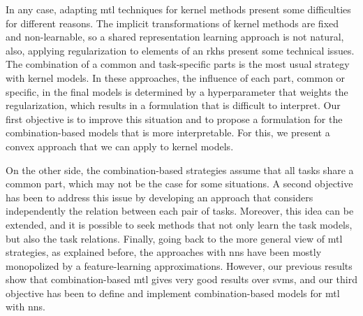 In any case, adapting \acrshort*{mtl} techniques for kernel methods present some difficulties for different reasons. The implicit transformations of kernel methods are fixed and non-learnable, so a shared representation learning approach is not natural, also, applying regularization to elements of an \acrshort{rkhs} present some technical issues. The combination of a common and task-specific parts is the most usual strategy with kernel models. 
In these approaches, the influence of each part, common or specific, in the final models is determined by a hyperparameter that weights the regularization, which results in a formulation that is difficult to interpret. Our first objective is to improve this situation and to propose a formulation for the combination-based models that is more interpretable. For this, we present a convex approach that we can apply to kernel models.

On the other side, the combination-based strategies assume that all tasks share a common part, which may not be the case for some situations. A second objective has been to address this issue by developing an approach that considers independently the relation between each pair of tasks. Moreover, this idea can be extended, and it is possible to seek methods that not only learn the task models, but also the task relations.
%
Finally, going back to the more general view of \acrshort{mtl} strategies, as explained before, the approaches with \acrshort{nns} have been mostly monopolized by a feature-learning approximations.
However, our previous results show that combination-based \acrshort{mtl} gives very good results over \acrshort{svms}, and our third objective has been
to %
define and implement combination-based models for \acrshort{mtl} with \acrshort{nns}.

